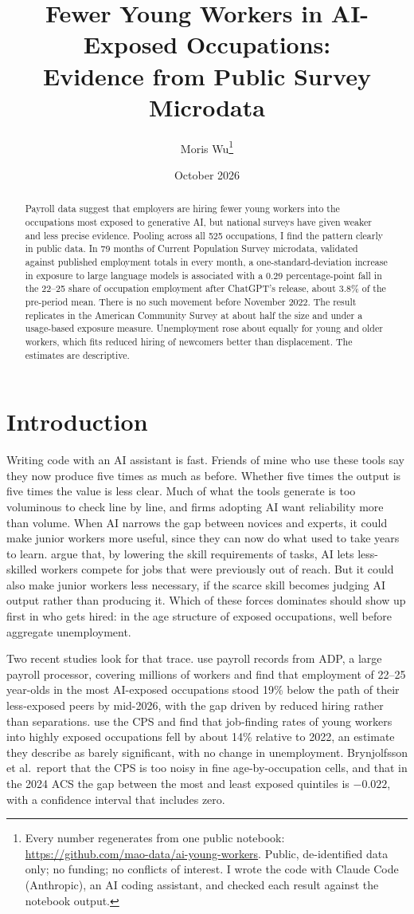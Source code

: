 \documentclass[11pt]{article}
\title{Fewer Young Workers in AI-Exposed Occupations:\\ Evidence from Public Survey Microdata}
\author{Moris Wu\thanks{Every number regenerates from one public notebook: \url{https://github.com/mao-data/ai-young-workers}. Public, de-identified data only; no funding; no conflicts of interest. I wrote the code with Claude Code (Anthropic), an AI coding assistant, and checked each result against the notebook output.}}
\date{October 2026}
\begin{document}
\maketitle

\begin{abstract}
\noindent Payroll data suggest that employers are hiring fewer young workers into the occupations most exposed to generative AI, but national surveys have given weaker and less precise evidence. Pooling across all 525 occupations, I find the pattern clearly in public data. In 79 months of Current Population Survey microdata, validated against published employment totals in every month, a one-standard-deviation increase in exposure to large language models is associated with a 0.29 percentage-point fall in the 22--25 share of occupation employment after ChatGPT's release, about 3.8\% of the pre-period mean. There is no such movement before November 2022. The result replicates in the American Community Survey at about half the size and under a usage-based exposure measure. Unemployment rose about equally for young and older workers, which fits reduced hiring of newcomers better than displacement. The estimates are descriptive.
\end{abstract}

\section{Introduction}

Writing code with an AI assistant is fast. Friends of mine who use these tools say they now produce five times as much as before. Whether five times the output is five times the value is less clear. Much of what the tools generate is too voluminous to check line by line, and firms adopting AI want reliability more than volume. When AI narrows the gap between novices and experts, it could make junior workers more useful, since they can now do what used to take years to learn. \citet{althoff2026} argue that, by lowering the skill requirements of tasks, AI lets less-skilled workers compete for jobs that were previously out of reach. But it could also make junior workers less necessary, if the scarce skill becomes judging AI output rather than producing it. Which of these forces dominates should show up first in who gets hired: in the age structure of exposed occupations, well before aggregate unemployment.

Two recent studies look for that trace. \citet{brynjolfsson2026} use payroll records from ADP, a large payroll processor, covering millions of workers and find that employment of 22--25 year-olds in the most AI-exposed occupations stood 19\% below the path of their less-exposed peers by mid-2026, with the gap driven by reduced hiring rather than separations. \citet{massenkoff2026} use the CPS and find that job-finding rates of young workers into highly exposed occupations fell by about 14\% relative to 2022, an estimate they describe as barely significant, with no change in unemployment. Brynjolfsson et al.\ report that the CPS is too noisy in fine age-by-occupation cells, and that in the 2024 ACS the gap between the most and least exposed quintiles is $-0.022$, with a confidence interval that includes zero.
\end{document}
